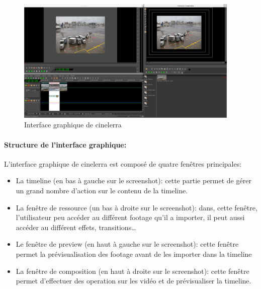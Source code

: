 \begin{figure} [H]

  \begin{center}

    \includegraphics[width=0.95\textwidth]{images/cinelerra}

  \end{center}

  \caption{Interface graphique de cinelerra}

  \label{Yes}

\end{figure}

\paragraph{Structure de l'interface graphique:}

L'interface graphique de cinelerra est composé de quatre fenêtres
principales:

\begin{itemize}
  \item {La timeline (en bas à gauche sur le screenshot): cette
    partie permet de gérer un grand nombre d'action sur le contenu de
    la timeline.}

  \item {La fenêtre de ressource (un bas à droite sur le screenshot):
    dans, cette fenêtre, l'utilisateur peu accéder au différent
    footage qu'il a importer, il peut aussi accéder au différent effets,
    transitions\ldots}

  \item {Le fenêtre de preview (en haut à gauche sur le screenshot):
    cette fenêtre permet la prévisualisation des footage avant de les
    importer dans la timeline}

  \item {La fenêtre de composition (en haut à droite sur le screenshot):
    cette fenêtre permet d'effectuer des operation sur les vidéo et
    de prévisualiser la timeline.}

\end{itemize}

